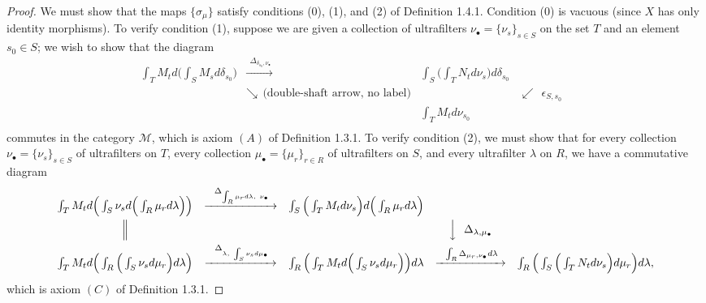 \documentclass[11pt]{article}
\theoremstyle{plain}
\theoremstyle{definition}
\begin{document}
\begin{proof}
We must show that the maps $\{\sigma_\mu\}$ satisfy conditions (0), (1), and (2) of Definition 1.4.1. Condition (0) is vacuous (since $X$ has only identity morphisms). To verify condition (1), suppose we are given a collection of ultrafilters $\nu_\bullet = \{\nu_s\}_{s \in S}$ on the set $T$ and an element $s_0 \in S$; we wish to show that the diagram
\[
\begin{array}{ccccc}
\int_T M_t d\Big(\int_S M_s d\delta_{s_0}\Big) & \xrightarrow{\ \ \Delta_{\delta_{s_0}, \nu_\bullet}\ } & \int_S \Big(\int_T N_t d\nu_s\Big) d\delta_{s_0} & & \\[6pt]
& \searrow{\ \ \text{(double-shaft arrow, no label)}} & & \swarrow{\ \ \epsilon_{S, s_0}} & \\[6pt]
& & \int_T M_t d\nu_{s_0} & & \\
\end{array}
\]
commutes in the category $\mathcal{M}$, which is axiom $(A)$ of Definition 1.3.1. To verify condition (2), we must show that for every collection $\nu_\bullet = \{\nu_s\}_{s \in S}$ of ultrafilters on $T$, every collection $\mu_\bullet = \{\mu_r\}_{r \in R}$ of ultrafilters on $S$, and every ultrafilter $\lambda$ on $R$, we have a commutative diagram
\[
\begin{array}{ccccc}
\int_T M_t d\Big(\int_S \nu_s d\Big(\int_R \mu_r d\lambda\Big)\Big) & \xrightarrow{\ \ \Delta_{\int_R \mu_r d\lambda,\ \nu_\bullet}\ } & \int_S \Big(\int_T M_t d\nu_s\Big) d\Big(\int_R \mu_r d\lambda\Big) & & \\[6pt]
\Big\Vert & & & \Big\downarrow{\ \ \Delta_{\lambda, \mu_\bullet}} & \\[6pt]
\int_T M_t d\Big(\int_R \Big(\int_S \nu_s d\mu_r\Big) d\lambda\Big) & \xrightarrow{\ \ \Delta_{\lambda,\ \int_S \nu_s d\mu_\bullet}\ } & \int_R \Big(\int_T M_t d\Big(\int_S \nu_s d\mu_r\Big)\Big) d\lambda & \xrightarrow{\ \ \int_R \Delta_{\mu_r, \nu_\bullet} d\lambda\ } & \int_R \Big(\int_S \Big(\int_T N_t d\nu_s\Big) d\mu_r\Big) d\lambda, \\
\end{array}
\]
which is axiom $(C)$ of Definition 1.3.1.

\end{proof}
\end{document}
